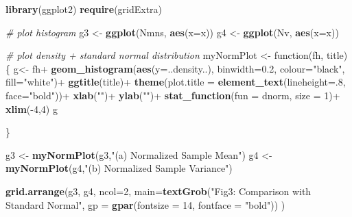 \documentclass[]{article}
\newenvironment{Shaded}{\begin{snugshade}}{\end{snugshade}}
\newcommand{\KeywordTok}[1]{\textcolor[rgb]{0.13,0.29,0.53}{\textbf{{#1}}}}
\newcommand{\DataTypeTok}[1]{\textcolor[rgb]{0.13,0.29,0.53}{{#1}}}
\newcommand{\DecValTok}[1]{\textcolor[rgb]{0.00,0.00,0.81}{{#1}}}
\newcommand{\FloatTok}[1]{\textcolor[rgb]{0.00,0.00,0.81}{{#1}}}
\newcommand{\StringTok}[1]{\textcolor[rgb]{0.31,0.60,0.02}{{#1}}}
\newcommand{\CommentTok}[1]{\textcolor[rgb]{0.56,0.35,0.01}{\textit{{#1}}}}
\newcommand{\NormalTok}[1]{{#1}}
\begin{document}
\begin{Shaded}
\begin{Highlighting}[]
\KeywordTok{library}\NormalTok{(ggplot2)}
\KeywordTok{require}\NormalTok{(gridExtra)}

\CommentTok{# plot histogram}
\NormalTok{g3 <-}\StringTok{ }\KeywordTok{ggplot}\NormalTok{(Nmns, }\KeywordTok{aes}\NormalTok{(}\DataTypeTok{x=}\NormalTok{x)) }
\NormalTok{g4 <-}\StringTok{ }\KeywordTok{ggplot}\NormalTok{(Nv, }\KeywordTok{aes}\NormalTok{(}\DataTypeTok{x=}\NormalTok{x)) }

\CommentTok{# plot density + standard normal distribution }
\NormalTok{myNormPlot <-}\StringTok{ }\NormalTok{function(fh, title)\{        }
        \NormalTok{g<-}\StringTok{ }\NormalTok{fh+}\StringTok{ }\KeywordTok{geom_histogram}\NormalTok{(}\KeywordTok{aes}\NormalTok{(}\DataTypeTok{y=}\NormalTok{..density..), }\DataTypeTok{binwidth=}\FloatTok{0.2}\NormalTok{, }\DataTypeTok{colour=}\StringTok{"black"}\NormalTok{, }\DataTypeTok{fill=}\StringTok{"white"}\NormalTok{)+}
\StringTok{        }\KeywordTok{ggtitle}\NormalTok{(title)+}
\StringTok{        }\KeywordTok{theme}\NormalTok{(}\DataTypeTok{plot.title =} \KeywordTok{element_text}\NormalTok{(}\DataTypeTok{lineheight=}\NormalTok{.}\DecValTok{8}\NormalTok{, }\DataTypeTok{face=}\StringTok{"bold"}\NormalTok{))+}
\StringTok{        }\KeywordTok{xlab}\NormalTok{(}\StringTok{""}\NormalTok{)+}
\StringTok{        }\KeywordTok{ylab}\NormalTok{(}\StringTok{""}\NormalTok{)+}
\StringTok{        }\KeywordTok{stat_function}\NormalTok{(}\DataTypeTok{fun =} \NormalTok{dnorm, }\DataTypeTok{size =} \DecValTok{1}\NormalTok{)+}
\StringTok{        }\KeywordTok{xlim}\NormalTok{(-}\DecValTok{4}\NormalTok{,}\DecValTok{4}\NormalTok{)}
        \NormalTok{g}
        
\NormalTok{\} }

\NormalTok{g3 <-}\StringTok{ }\KeywordTok{myNormPlot}\NormalTok{(g3,}\StringTok{"(a) Normalized Sample Mean"}\NormalTok{)}
\NormalTok{g4 <-}\StringTok{ }\KeywordTok{myNormPlot}\NormalTok{(g4,}\StringTok{"(b) Normalized Sample Variance"}\NormalTok{)}

\KeywordTok{grid.arrange}\NormalTok{(g3, g4, }\DataTypeTok{ncol=}\DecValTok{2}\NormalTok{, }
             \DataTypeTok{main=}\KeywordTok{textGrob}\NormalTok{(}\StringTok{"Fig3: Comparison with Standard Normal"}\NormalTok{,}
                           \DataTypeTok{gp =} \KeywordTok{gpar}\NormalTok{(}\DataTypeTok{fontsize =} \DecValTok{14}\NormalTok{, }
                                     \DataTypeTok{fontface =} \StringTok{"bold"}\NormalTok{))}
             \NormalTok{)}
\end{Highlighting}
\end{Shaded}
\end{document}
